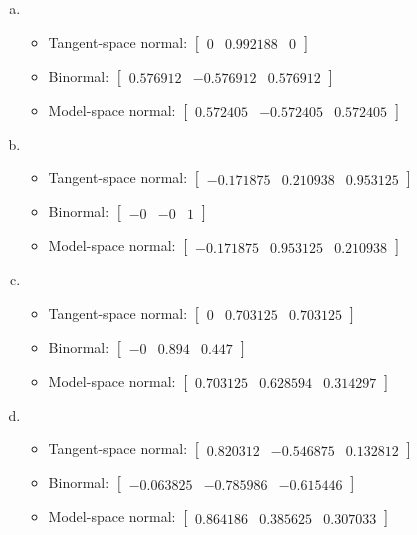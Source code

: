 \documentclass[11pt]{article}
\begin{document}
\begin{enumerate}[a.]
	\item %
	\begin{itemize}
		\item Tangent-space normal: $\begin{bmatrix} 0 & 0.992188 & 0 \end{bmatrix}$
		\item Binormal: $\begin{bmatrix} 0.576912 & -0.576912 & 0.576912 \end{bmatrix}$
		\item Model-space normal: $\begin{bmatrix} 0.572405 & -0.572405 & 0.572405 \end{bmatrix}$
	\end{itemize}
	\item %
	\begin{itemize}
		\item Tangent-space normal: $\begin{bmatrix} -0.171875 & 0.210938 & 0.953125 \end{bmatrix}$
		\item Binormal: $\begin{bmatrix} -0 & -0 & 1 \end{bmatrix}$
		\item Model-space normal: $\begin{bmatrix} -0.171875 & 0.953125 & 0.210938 \end{bmatrix}$
	\end{itemize}
	\item %
	\begin{itemize}
		\item Tangent-space normal: $\begin{bmatrix} 0 & 0.703125 & 0.703125 \end{bmatrix}$
		\item Binormal: $\begin{bmatrix} -0 & 0.894 & 0.447 \end{bmatrix}$
		\item Model-space normal: $\begin{bmatrix} 0.703125 & 0.628594 & 0.314297 \end{bmatrix}$
	\end{itemize}
	\item %
	\begin{itemize}
		\item Tangent-space normal: $\begin{bmatrix} 0.820312 & -0.546875 & 0.132812 \end{bmatrix}$
		\item Binormal: $\begin{bmatrix} -0.063825 & -0.785986 & -0.615446 \end{bmatrix}$
		\item Model-space normal: $\begin{bmatrix} 0.864186 & 0.385625 & 0.307033 \end{bmatrix}$
	\end{itemize}
\end{enumerate}
\end{document}
